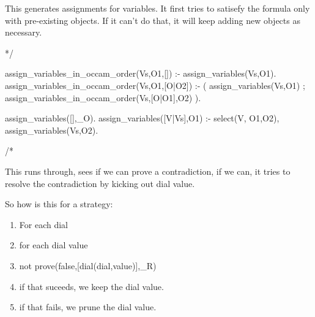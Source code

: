 \documentclass{book}[9pt]
\newenvironment{code}%
{\small \verbatim}%
{\endverbatim \large}
\begin{document}
This generates assignments for variables. It first tries to satisefy
the formula only with pre-existing objects.  If it can't do that, it
will keep adding new objects as necessary.

\begin{code}
*/

assign_variables_in_occam_order(Vs,O1,[]) :-
	assign_variables(Vs,O1).
assign_variables_in_occam_order(Vs,O1,[O|O2]) :-
	( assign_variables(Vs,O1)
          ; 
	  assign_variables_in_occam_order(Vs,[O|O1],O2)
        ).


assign_variables([],_O).
assign_variables([V|Vs],O1) :-
	select(V, O1,O2),
	assign_variables(Vs,O2).

/*
\end{code}

This runs through, sees if we can prove a contradiction, if we can, it
tries to resolve the contradiction by kicking out dial value.

So how is this for a strategy:
\begin{enumerate}
\item For each dial
\item for each dial value
\item not prove(false,[dial(dial,value)],\_R)
\item if that suceeds, we keep the dial value.
\item if that fails, we prune the dial value.
\end{enumerate}
\end{document}

